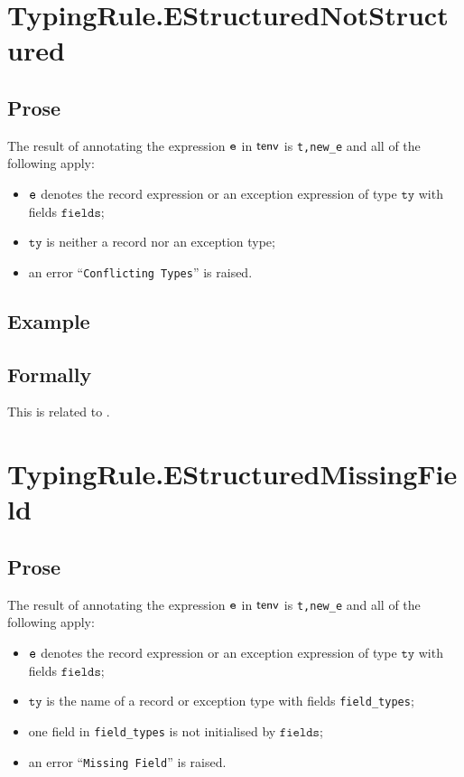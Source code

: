 \documentclass{book}
\newcommand\tty[0]{\texttt{ty}}
\newcommand\fields[0]{\texttt{fields}}
\begin{document}
\section{TypingRule.EStructuredNotStructured \label{sec:TypingRule.EStructuredNotStructured}}

  \subsection{Prose}
  The result of annotating the expression $\texttt{e}$ in $\textsf{tenv}$ is
\texttt{t,new\_e} and all of the following apply:
  \begin{itemize}
  \item $\texttt{e}$ denotes the record expression or an exception expression of type $\tty$ with fields $\fields$;
  \item $\tty$ is neither a record nor an exception type;
  \item an error ``\texttt{Conflicting Types}'' is raised.
  \end{itemize}

  \subsection{Example}



\begin{emptyformal}
    \subsection{Formally}
\end{emptyformal}


  This is related to .

\section{TypingRule.EStructuredMissingField \label{sec:TypingRule.EStructuredMissingField}}

  \subsection{Prose}
  The result of annotating the expression $\texttt{e}$ in $\textsf{tenv}$ is
\texttt{t,new\_e} and all of the following apply:
  \begin{itemize}
  \item $\texttt{e}$ denotes the record expression or an exception expression of type $\tty$ with fields $\fields$;
  \item $\tty$ is the name of a record or exception type with fields \texttt{field\_types};
  \item one field in \texttt{field\_types} is not initialised by $\fields$;
  \item an error ``\texttt{Missing Field}'' is raised.
  \end{itemize}
\end{document}
